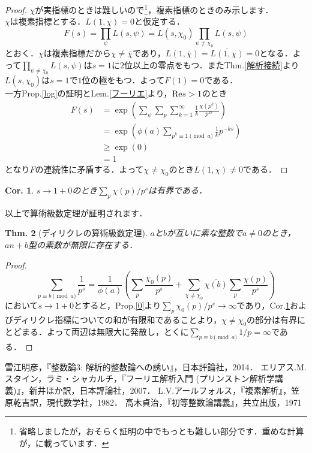 \documentclass[dvipdfmx,b5paper,papersize]{jsarticle}
\newtheorem{thm}{Thm.}
\newtheorem{cor}[thm]{Cor.}
\begin{document}
\begin{proof}
$\chi$が実指標のときは難しいので\footnote{省略しましたが，おそらく証明の中でもっとも難しい部分です．重めな計算が\cite{雪江}，\cite{シャカルチ}に載っています．}，複素指標のときのみ示します．\\
$\chi$は複素指標とする．$L(1,\chi)=0$と仮定する．
\[
F(s)=\prod_{\psi} L(s,\psi)=L(s,\chi_{0})\prod_{\psi \neq \chi_{0}} L(s,\psi)
\]
とおく．$\chi$は複素指標だから$\chi \neq \overline{\chi}$であり，$L(1,\overline{\chi})=\overline{L(1,\chi)}=0$となる．よって$\prod_{\psi \neq \chi_{0}} L(s,\psi)$は$s=1$に$2$位以上の零点をもつ．またThm.\ref{解析接続}より$L(s,\chi_{0})$は$s=1$で$1$位の極をもつ．よって$F(1)=0$である．\\
一方Prop.\ref{log}の証明とLem.\ref{フーリエ}より，${\rm Re}s>1$のとき
\begin{align*}
F(s)&=\exp \left(\sum_{\psi} \sum_{p} \sum_{k=1}^{\infty} \frac{1}{k} \frac{\chi(p^k)}{p^{ks}} \right)\\
&=\exp \left(\phi(a) \sum_{p^k \equiv 1 \pmod{a}} \frac{1}{k} p^{-ks} \right)\\
&\geq \exp(0)\\
&=1
\end{align*}
となり$F$の連続性に矛盾する．よって$\chi \neq \chi_{0}$のとき$L(1,\chi) \neq 0$である．
\end{proof}
\begin{cor} \label{n0}
$s \to 1+0$のとき$\sum_p {\chi(p)}/{p^s}$は有界である．
\end{cor}
以上で算術級数定理が証明されます．
\begin{thm}[ディリクレの算術級数定理]
$a$と$b$が互いに素な整数で$a\neq0$のとき，$an+b$型の素数が無限に存在する．
\end{thm}
\begin{proof}
\[
\sum_{p\equiv b\pmod{a}}\frac{1}{p^s}=\frac{1}{\phi(a)} \left( \sum_p \frac{\chi_{0}(p)}{p^s}+ \sum_{\chi \neq \chi_{0}}\overline{\chi(b)}\sum_p \frac{\chi(p)}{p^s} \right)
\]
において$s \to 1+0$とすると，Prop.\ref{0}より$\sum_p {\chi_{0}(p)}/{p^s} \to \infty$であり，Cor.\ref{n0}およびディリクレ指標についての和が有限和であることより，$\chi \neq \chi_{0}$の部分は有界にとどまる．よって両辺は無限大に発散し，とくに$\sum_{p\equiv b\pmod{a}}1/p=\infty$である．
\end{proof}
\begin{thebibliography}{2}
 雪江明彦，『整数論3: 解析的整数論への誘い』，日本評論社，2014．
 エリアス.M.スタイン，ラミ・シャカルチ，『フーリエ解析入門 (プリンストン解析学講義)』，新井ほか訳，日本評論社，2007．
 L.V.アールフォルス，『複素解析』，笠原乾吉訳，現代数学社，1982．
 高木貞治，『初等整数論講義』，共立出版，1971
\end{thebibliography}
\end{document}
